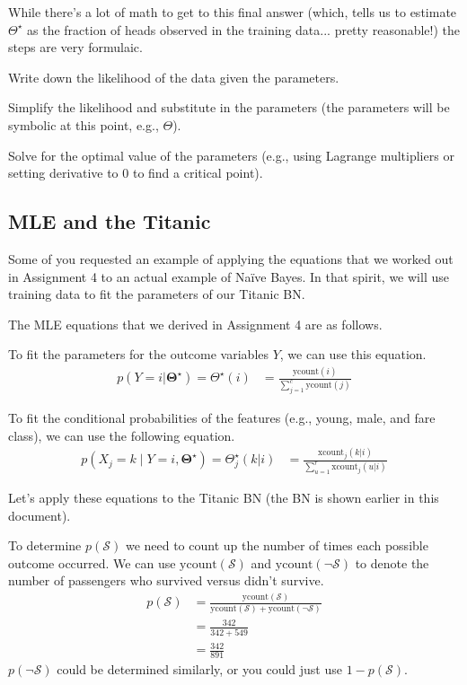 \documentclass[review_Solutions]{subfiles}
\begin{document}
While there's a lot of math to get to this final answer (which, tells us to estimate $\Theta^\star$ as the fraction of heads observed in the training data... pretty reasonable!) the steps are very formulaic.
\be
\item Write down the likelihood of the data given the parameters.
\item Simplify the likelihood and substitute in the parameters (the parameters will be symbolic at this point, e.g., $\Theta$).
\item Solve for the optimal value of the parameters (e.g., using Lagrange multipliers or setting derivative to 0 to find a critical point).
\ee

\subsection{MLE and the Titanic}

Some of you requested an example of applying the equations that we worked out in Assignment 4 to an actual example of Na\"ive Bayes.  In that spirit, we will use training data to fit the parameters of our Titanic BN.


The MLE equations that we derived in Assignment 4 are as follows.

\bi
\item To fit the parameters for the outcome variables $Y$, we can use this equation.
\begin{align}
p(Y=i |  \mathbf{\Theta^\star}) = \Theta^\star(i) &= \frac{\mbox{ycount}(i)}{\sum_{j=1}^c \mbox{ycount}(j)}
\end{align}
\item  To fit the conditional probabilities of the features (e.g., young, male, and fare class), we can use the following equation.
\begin{align}
p(X_j = k \mid Y=i , \mathbf{\Theta^\star}) = \Theta_j^\star(k|i) &= \frac{\mbox{xcount}_j(k|i)}{\sum_{u=1}^r \mbox{xcount}_j(u|i)}
\end{align}
\ei

Let's apply these equations to the Titanic BN (the BN is shown earlier in this document).

\bi
\item To determine $p(\mathcal{S})$ we need to count up the number of times each possible outcome occurred.  We can use $\mbox{ycount}(\mathcal{S})$ and  $\mbox{ycount}(\neg \mathcal{S})$ to denote the number of passengers who survived versus didn't survive.
\begin{align}
p(\mathcal{S}) &= \frac{\mbox{ycount}(\mathcal{S})}{\mbox{ycount}(\mathcal{S}) + \mbox{ycount}(\neg \mathcal{S})} \nonumber \\
&= \frac{342}{342+549} \nonumber \\
&= \frac{342}{891} \nonumber
\end{align}
$p(\neg \mathcal{S})$ could be determined similarly, or you could just use $1-p(\mathcal{S})$.
\end{document}
